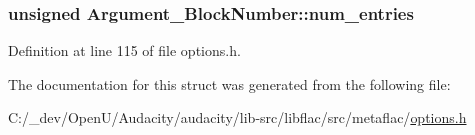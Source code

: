 \subsubsection[{\texorpdfstring{num\+\_\+entries}{num_entries}}]{\setlength{\rightskip}{0pt plus 5cm}unsigned Argument\+\_\+\+Block\+Number\+::num\+\_\+entries}\hypertarget{struct_argument___block_number_ade95a9211b282ffe7e4a5f78460dacc4}{}\label{struct_argument___block_number_ade95a9211b282ffe7e4a5f78460dacc4}


Definition at line 115 of file options.\+h.



The documentation for this struct was generated from the following file\+:\begin{DoxyCompactItemize}
\item 
C\+:/\+\_\+dev/\+Open\+U/\+Audacity/audacity/lib-\/src/libflac/src/metaflac/\hyperlink{libflac_2src_2metaflac_2options_8h}{options.\+h}\end{DoxyCompactItemize}
